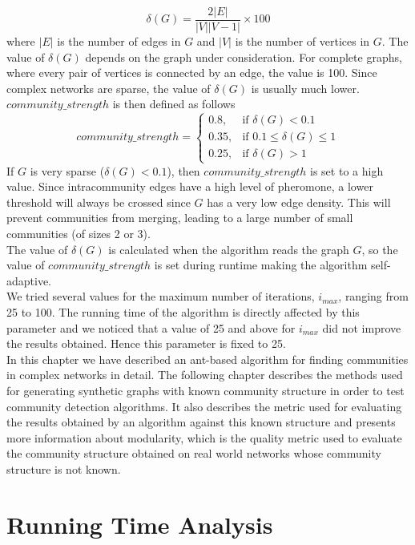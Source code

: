 \begin{spacing}{1.5}
\begin{equation}
\delta(G) = \frac{2|E|}{|V||V-1|}\times 100
\end{equation}
where $|E|$ is the number of edges in $G$ and $|V|$ is the number of vertices in $G$. The value of $\delta(G)$ depends on the graph under consideration. For complete graphs, where every pair of vertices is connected by an edge, the value is 100. Since complex networks are sparse, the value of $\delta(G)$ is usually much lower. $community\_strength$ is then defined as follows
\begin{equation}
community\_strength = 
	\begin{cases}
	0.8, & \text{if } \delta(G) < 0.1\\
	0.35, & \text{if } 0.1 \leq \delta(G) \leq 1\\
	0.25, & \text{if } \delta(G) > 1
	\end{cases}
\end{equation}
If $G$ is very sparse ($\delta(G) < 0.1$), then $community\_strength$ is set to a high value. Since intracommunity edges have a high level of pheromone, a lower threshold will always be crossed since $G$ has a very low edge density. This will prevent communities from merging, leading to a large number of small communities (of sizes 2 or 3).\\
\indent The value of $\delta(G)$ is calculated when the algorithm reads the graph $G$, so the value of $community\_strength$ is set during runtime making the algorithm self-adaptive.\\
\indent We tried several values for the maximum number of iterations, $i_{max}$, ranging from 25 to 100. The running time of the algorithm is directly affected by this parameter and we noticed that a value of 25 and above for $i_{max}$ did not improve the results obtained. Hence this parameter is fixed to 25.\\
\indent In this chapter we have described an ant-based algorithm for finding communities in complex networks in detail. The following chapter describes the methods used for generating synthetic graphs with known community structure in order to test community detection algorithms. It also describes the metric used for evaluating the results obtained by an algorithm against this known structure and presents more information about modularity, which is the quality metric used to evaluate the community structure obtained on real world networks whose community structure is not known.

\section{Running Time Analysis}


\end{spacing}
